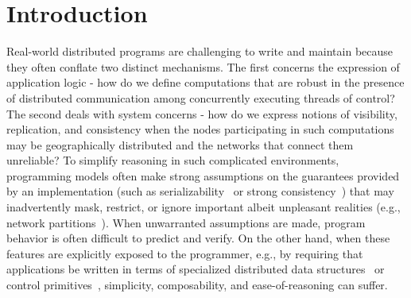 \section{Introduction}
\label{sec:intro}

Real-world distributed programs are challenging to write and maintain
because they often conflate two distinct mechanisms.  The first
concerns the expression of application logic - how do we define
computations that are robust in the presence of distributed
communication among concurrently executing threads of control?  The
second deals with system concerns - how do we express notions of
visibility, replication, and consistency when the nodes participating
in such computations may be geographically distributed and the
networks that connect them unreliable?  To simplify reasoning in such
complicated environments, programming models often make strong
assumptions on the guarantees provided by an implementation (such as
serializability~\cite{Serializability} or strong
consistency~\cite{CDE+12,DNN+15}) that may inadvertently mask,
restrict, or ignore important albeit unpleasant realities (e.g.,
network partitions~\cite{Brewer2000,Gilbert2002}). When unwarranted
assumptions are made, program behavior is often difficult to predict
and verify.  On the other hand, when these features are explicitly
exposed to the programmer, e.g., by requiring that applications be
written in terms of specialized distributed data
structures~\cite{Burckhardt2014,BFL+12,SPB+11} or control
primitives~\cite{Calm}, simplicity, composability, and
ease-of-reasoning can suffer.


